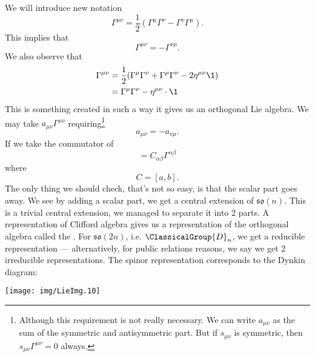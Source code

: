 We will introduce new notation
\begin{equation}
\Gamma^{\mu\nu} =
\frac{1}{2}(\Gamma^{\mu}\Gamma^{\nu}-\Gamma^{\nu}\Gamma^{\mu}).
\end{equation}
This implies that
\begin{equation}
\Gamma^{\mu\nu}=-\Gamma^{\nu\mu}.
\end{equation}
We also observe that
\begin{subequations}
\begin{align}
\Gamma^{\mu\nu} &=
\frac{1}{2}(\Gamma^{\mu}\Gamma^{\nu}+\Gamma^{\mu}\Gamma^{\nu}-2\eta^{\mu\nu}\1)\\
&= \Gamma^{\mu}\Gamma^{\nu}-\eta^{\mu\nu}\cdot\1
\end{align}
\end{subequations}
This is something created in such a way it gives us an orthogonal
Lie algebra. We may take $a_{\mu\nu}\Gamma^{\mu\nu}$
requiring\footnote{Although this requirement is not really
  necessary. We can write $a_{\mu\nu}$ as the sum of the
  symmetric and antisymmetric part. But if $s_{\mu\nu}$ is
  symmetric, then $s_{\mu\nu}\Gamma^{\mu\nu}=0$ always.}
\begin{equation}
a_{\mu\nu}=-a_{\nu\mu}.
\end{equation}
If we take the commutator of
\begin{equation}
[a_{\mu\nu}\Gamma^{\mu\nu},b_{\rho\sigma}\Gamma^{\rho\sigma}]=C_{\alpha\beta}\Gamma^{\alpha\beta}
\end{equation}
where
\begin{equation}
C=[a,b].
\end{equation}
The only thing we should check, that's not so easy, is that the
scalar part goes away. We see by adding a scalar part, we get a
central extension of $\mathfrak{so}(n)$. This is a trivial
central extension, we managed to separate it into 2 parts. A
representation of Clifford algebra gives us a representation of
the orthogonal algebra called the . For $\mathfrak{so}(2n)$,
i.e. $\ClassicalGroup{D}_{n}$, we get a reducible representation
--- alternatively, for public relations reasons, we say we get 2
irreducible representations. The spinor representation
corresponds to the Dynkin diagram:
\begin{center}
\texttt{[image: img/LieImg.10]}
\end{center}


